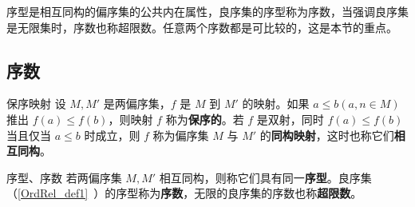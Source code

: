 序型是相互同构的偏序集的公共内在属性，良序集的序型称为序数，当强调良序集是无限集时，序数也称超限数。任意两个序数都是可比较的，这是本节的重点。
\subsection{序数}
\begin{definition}{保序映射}
设 $M,M'$ 是两偏序集，$f$ 是 $M$ 到 $M'$ 的映射。如果 $a\leq b(a,n\in M)$ 推出 $f(a)\leq f(b)$，则映射 $f$ 称为\textbf{保序的}。若 $f$ 是双射，同时 $f(a)\leq f(b)$ 当且仅当 $a\leq b$ 时成立，则 $f$ 称为偏序集 $M$ 与 $M'$ 的\textbf{同构映射}，这时也称它们\textbf{相互同构}。
\end{definition}
\begin{definition}{序型、序数}
若两偏序集 $M,M'$ 相互同构，则称它们具有同一\textbf{序型}。良序集（\autoref{OrdRel_def1}~）的序型称为\textbf{序数}，无限的良序集的序数也称\textbf{超限数}。
\end{definition}
